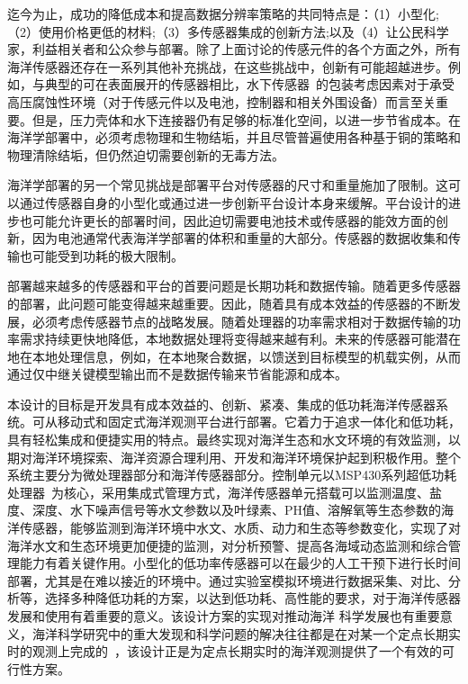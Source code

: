 迄今为止，成功的降低成本和提高数据分辨率策略的共同特点是：（1）小型化;（2）使用价格更低的材料;（3）多传感器集成的创新方法;以及（4）让公民科学家，利益相关者和公众参与部署。除了上面讨论的传感元件的各个方面之外，所有海洋传感器还存在一系列其他补充挑战，在这些挑战中，创新有可能超越进步。例如，与典型的可在表面展开的传感器相比，水下传感器~\cite{朱光文2000海洋环境监测与现代传感器技术,李彦2006海洋监测传感器网络概念与应用探讨,王骥2008基于无线传感器网络的海洋环境监测系统研究,刘妹琴2021基于水下传感器网络的目标跟踪技术研究现状与展望}的包装考虑因素对于承受高压腐蚀性环境（对于传感元件以及电池，控制器和相关外围设备）而言至关重要。但是，压力壳体和水下连接器仍有足够的标准化空间，以进一步节省成本。在海洋学部署中，必须考虑物理和生物结垢，并且尽管普遍使用各种基于铜的策略和物理清除结垢，但仍然迫切需要创新的无毒方法。

海洋学部署的另一个常见挑战是部署平台对传感器的尺寸和重量施加了限制。这可以通过传感器自身的小型化或通过进一步创新平台设计本身来缓解。平台设计的进步也可能允许更长的部署时间，因此迫切需要电池技术或传感器的能效方面的创新，因为电池通常代表海洋学部署的体积和重量的大部分。传感器的数据收集和传输也可能受到功耗的极大限制。

部署越来越多的传感器和平台的首要问题是长期功耗和数据传输。随着更多传感器的部署，此问题可能变得越来越重要。因此，随着具有成本效益的传感器的不断发展，必须考虑传感器节点的战略发展。随着处理器的功率需求相对于数据传输的功率需求持续更快地降低，本地数据处理将变得越来越有利。未来的传感器可能潜在地在本地处理信息，例如，在本地聚合数据，以馈送到目标模型的机载实例，从而通过仅中继关键模型输出而不是数据传输来节省能源和成本。

本设计的目标是开发具有成本效益的、创新、紧凑、集成的低功耗海洋传感器系统。可从移动式和固定式海洋观测平台进行部署。它着力于追求一体化和低功耗，具有轻松集成和便捷实用的特点。最终实现对海洋生态和水文环境的有效监测，以期对海洋环境探索、海洋资源合理利用、开发和海洋环境保护起到积极作用。整个系统主要分为微处理器部分和海洋传感器部分。控制单元以MSP430系列超低功耗处理器~\cite{davies2008msp430}为核心，采用集成式管理方式，海洋传感器单元搭载可以监测温度、盐度、深度、水下噪声信号等水文参数以及叶绿素、PH值、溶解氧等生态参数的海洋传感器，能够监测到海洋环境中水文、水质、动力和生态等参数变化，实现了对海洋水文和生态环境更加便捷的监测，对分析预警、提高各海域动态监测和综合管理能力有着关键作用。小型化的低功率传感器可以在最少的人工干预下进行长时间部署，尤其是在难以接近的环境中。通过实验室模拟环境进行数据采集、对比、分析等，选择多种降低功耗的方案，以达到低功耗、高性能的要求，对于海洋传感器发展和使用有着重要的意义。该设计方案的实现对推动海洋 科学发展也有重要意义，海洋科学研究中的重大发现和科学问题的解决往往都是在对某一个定点长期实时的观测上完成的~\cite{2017lqk}，该设计正是为定点长期实时的海洋观测提供了一个有效的可行性方案。

